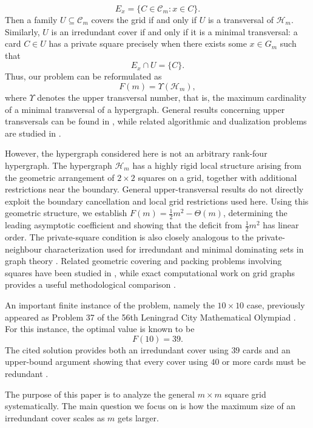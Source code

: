 \documentclass[11pt]{article}
\begin{document}
	
	\[
	E_x=\{C\in\mathcal C_m:x\in C\}.
	\]
	Then a family \(U\subseteq\mathcal C_m\) covers the grid if and only if \(U\)
	is a transversal of \(\mathcal H_m\). Similarly, \(U\) is an irredundant cover
	if and only if it is a minimal transversal: a card \(C\in U\) has a private
	square precisely when there exists some \(x\in G_m\) such that
	\[
	E_x\cap U=\{C\}.
	\]
	Thus, our problem can be reformulated as
	\[
	F(m)=\Upsilon(\mathcal H_m),
	\]
	where \(\Upsilon\) denotes the upper transversal number, that is, the maximum
	cardinality of a minimal transversal of a hypergraph. General results
	concerning upper transversals can be found in
	\cite{henningyeo2018,henningyeo2019,henningyeo2020}, while related algorithmic
	and dualization problems are studied in
	\cite{fredmankhachiyan1996,borosetal2001,damaschke2011}.
	
	However, the hypergraph considered here is not an arbitrary rank-four
	hypergraph. The hypergraph \(\mathcal H_m\) has a highly rigid local structure
	arising from the geometric arrangement of \(2\times2\) squares on a grid,
	together with additional restrictions near the boundary. General upper-transversal results do not directly exploit the
	boundary cancellation and local grid restrictions used here.
	Using this geometric structure, we establish
	$F(m)=\frac12m^2-\Theta(m)$, determining the leading asymptotic
	coefficient and showing that the deficit from $\frac12m^2$
	has linear order. The private-square
	condition is also closely analogous to the private-neighbour characterization
	used for irredundant and minimal dominating sets in graph theory
	\cite{cockaynehedetniemi1978,bazganetal2018}. Related geometric covering and
	packing problems involving squares have been studied in
	\cite{elkhechenetal2009,biedletal2021,baloghetal2025}, while exact
	computational work on grid graphs provides a useful methodological comparison
	\cite{alankoetal2011}.
	
	An important finite instance of the problem, namely the \(10\times10\) case,
	previously appeared as Problem 37 of the 56th Leningrad City Mathematical
	Olympiad \cite{lmo1990archive,vasilievfomin1990}. For this instance, the optimal
	value is known to be
	\[
	F(10)=39.
	\]
	The cited solution provides both an irredundant cover using \(39\) cards
	and an upper-bound argument showing that every cover using \(40\) or
	more cards must be redundant \cite{fomin2025}.
	
	
	The purpose of this paper is to analyze the general \(m\times m\)
	square grid systematically. The main question we focus on is
	how the maximum size of an irredundant cover scales as \(m\)
	gets larger.
	
\end{document}
